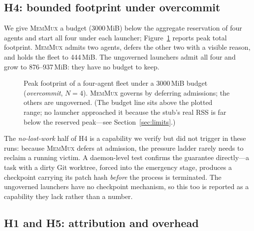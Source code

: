 \documentclass[11pt]{article}
\newcommand{\sys}{\textsc{MemMux}}
\begin{document}
\subsection{H4: bounded footprint under overcommit}

We give \sys{} a budget (3000\,MiB) below the aggregate reservation of four agents and start all four
under each launcher; Figure~\ref{fig:h4} reports peak total footprint. \sys{} admits two agents,
defers the other two with a visible reason, and holds the fleet to 444\,MiB. The ungoverned
launchers admit all four and grow to 876--937\,MiB: they have no budget to keep.

\begin{figure}[t]
\centering
{}
\caption{Peak footprint of a four-agent fleet under a 3000\,MiB budget (\emph{overcommit}, $N{=}4$).
\sys{} governs by deferring admissions; the others are ungoverned. (The budget line sits above the
plotted range; no launcher approached it because the stub's real RSS is far below the reserved
peak---see Section~\ref{sec:limits}.)}
\label{fig:h4}
\end{figure}

The \emph{no-lost-work} half of H4 is a capability we verify but did not trigger in these runs:
because \sys{} defers at admission, the pressure ladder rarely needs to reclaim a running victim.
A daemon-level test confirms the guarantee directly---a task with a dirty Git worktree, forced into
the emergency stage, produces a checkpoint carrying its patch hash \emph{before} the process is
terminated. The ungoverned launchers have no checkpoint mechanism, so this too is reported as a
capability they lack rather than a number.

\subsection{H1 and H5: attribution and overhead}
\end{document}

